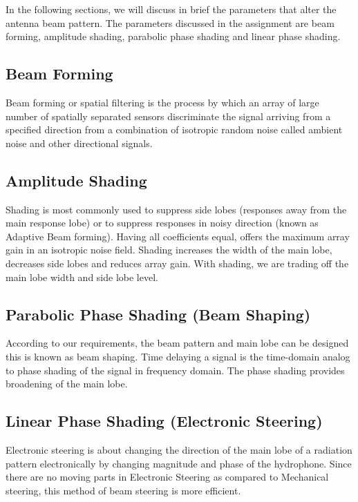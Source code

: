 \noindent In the following sections, we will discuss in brief the parameters that alter the antenna beam pattern. The parameters discussed in the assignment are beam forming, amplitude shading, parabolic phase shading and linear phase shading.

\subsection{ Beam Forming } \label{ Beam Forming} 
\noindent Beam forming or spatial filtering is the process by which an array of large number of spatially separated sensors discriminate the signal arriving from a specified direction from a combination of isotropic random noise called ambient noise and other directional signals.

\subsection{ Amplitude Shading } \label{ Amplitude Shading } 
\noindent Shading is most commonly used to suppress side lobes (responses away from the main response lobe) or to suppress responses in noisy direction (known as Adaptive Beam forming). Having all coefficients equal, offers the maximum array gain in an isotropic noise field. Shading increases the width of the main lobe, decreases side lobes and reduces array gain. With shading, we are trading off the main lobe width and side lobe level.

\subsection{ Parabolic Phase Shading (Beam Shaping) } \label{ Parabolic Phase Shading (Beam Shaping) } 
\noindent According to our requirements, the beam pattern and main lobe can be designed this is known as beam shaping. Time delaying a signal is the time-domain analog to phase shading of the signal in frequency domain. The phase shading provides broadening of the main lobe.

\subsection{ Linear Phase Shading (Electronic Steering) } \label{ Linear Phase Shading (Electronic Steering) } 
\noindent Electronic steering is about changing the direction of the main lobe of a radiation pattern electronically by changing magnitude and phase of the hydrophone. Since there are no moving parts in Electronic Steering as compared to Mechanical steering, this method of beam steering is more efficient.

